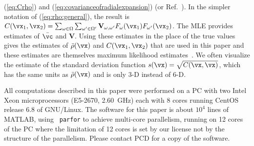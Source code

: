 (\ref{eq:Crho}) and (\ref{eq:covarianceofradialexpansion})
(or Ref.~\cite[Eq.~18]{YiliZhengQiuWangDoerschukJOSA2012}).
In the simpler notation of (\ref{eq:rho:general}), the result is
$\CrhoREAL(\vx_1,\vx_2)=\sum_{\omega\in\Omega}
\sum_{\omega^\prime\in\Omega^\prime}
\mathbf{V}_{\omega,\omega^\prime}
F_\omega(\vx_1)
F_{\omega^\prime}(\vx_2)$.
The MLE provides estimates of $\bar{\vc}$ and $\mathbf{V}$.
Using these estimates in the place of the true values gives the estimates
of $\bar\rho(\vx)$ and $\CrhoREAL(\vx_1,\vx_2)$ that are used in this paper
and these estimates are themselves maximum likelihood
estimates~\cite[Thm.~7.2.10 p.~320]{CasellaBerger2002}.
We often visualize the estimate of the standard deviation function
$s(\vx)=\sqrt{\CrhoREAL(\vx,\vx)}$, which has the same
units as $\bar\rho(\vx)$ and is only 3-D instead of 6-D.
\par
All computations described in this paper were performed on a PC with two
Intel Xeon microprocessors (E5-2670, 2.60~GHz) each with 8 cores running
CentOS release 6.8 of GNU/Linux.
The software for this paper is about $10^4$ lines of MATLAB, using {\tt
  parfor} to achieve multi-core parallelism, running on 12 cores of the PC
where the limitation of 12 cores is set by our license not by the structure
of the parallelism.
Please contact PCD for a copy of the software.
